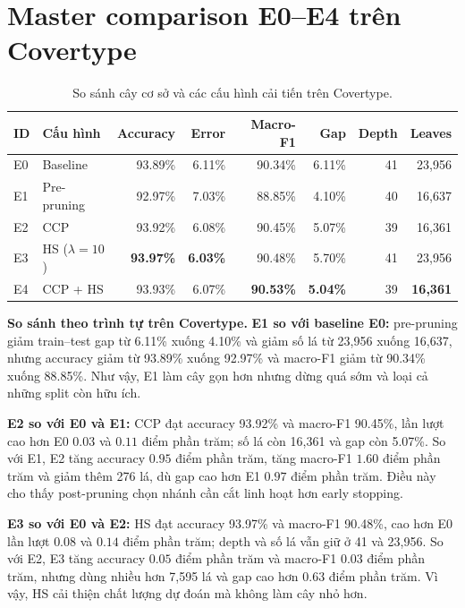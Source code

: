 \section{Master comparison E0--E4 trên Covertype}

\begin{table}[H]
    \centering
    \footnotesize
    \caption[So sánh E0--E4 trên Covertype]{So sánh cây cơ sở và các cấu hình cải tiến trên Covertype.}
    \label{tab:improvement-master}
    \begin{tabular*}{\textwidth}{@{\extracolsep{\fill}}llrrrrrr@{}}
        \toprule
        \textbf{ID} & \textbf{Cấu hình} & \textbf{Accuracy} & \textbf{Error} & \textbf{Macro-F1} & \textbf{Gap} & \textbf{Depth} & \textbf{Leaves} \\
        \midrule
        E0 & Baseline & 93.89\% & 6.11\% & 90.34\% & 6.11\% & 41 & 23,956 \\
        E1 & Pre-pruning & 92.97\% & 7.03\% & 88.85\% & 4.10\% & 40 & 16,637 \\
        E2 & CCP & 93.92\% & 6.08\% & 90.45\% & 5.07\% & 39 & 16,361 \\
        E3 & HS ($\lambda=10$) & \textbf{93.97\%} & \textbf{6.03\%} & 90.48\% & 5.70\% & 41 & 23,956 \\
        E4 & CCP + HS & 93.93\% & 6.07\% & \textbf{90.53\%} & \textbf{5.04\%} & 39 & \textbf{16,361} \\
        \bottomrule
    \end{tabular*}
\end{table}

\textbf{So sánh theo trình tự trên Covertype.} \textbf{E1 so với baseline E0:} pre-pruning giảm train--test gap từ 6.11\% xuống 4.10\% và giảm số lá từ 23,956 xuống 16,637, nhưng accuracy giảm từ 93.89\% xuống 92.97\% và macro-F1 giảm từ 90.34\% xuống 88.85\%. Như vậy, E1 làm cây gọn hơn nhưng dừng quá sớm và loại cả những split còn hữu ích.

\textbf{E2 so với E0 và E1:} CCP đạt accuracy 93.92\% và macro-F1 90.45\%, lần lượt cao hơn E0 $0.03$ và $0.11$ điểm phần trăm; số lá còn 16,361 và gap còn 5.07\%. So với E1, E2 tăng accuracy $0.95$ điểm phần trăm, tăng macro-F1 $1.60$ điểm phần trăm và giảm thêm 276 lá, dù gap cao hơn E1 $0.97$ điểm phần trăm. Điều này cho thấy post-pruning chọn nhánh cần cắt linh hoạt hơn early stopping.

\textbf{E3 so với E0 và E2:} HS đạt accuracy 93.97\% và macro-F1 90.48\%, cao hơn E0 lần lượt $0.08$ và $0.14$ điểm phần trăm; depth và số lá vẫn giữ ở 41 và 23,956. So với E2, E3 tăng accuracy $0.05$ điểm phần trăm và macro-F1 $0.03$ điểm phần trăm, nhưng dùng nhiều hơn 7,595 lá và gap cao hơn $0.63$ điểm phần trăm. Vì vậy, HS cải thiện chất lượng dự đoán mà không làm cây nhỏ hơn.

